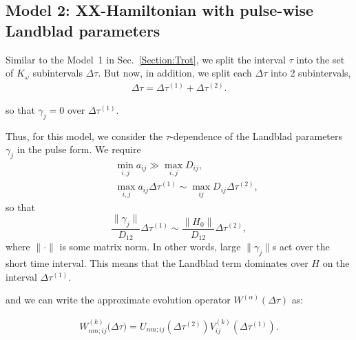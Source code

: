 \documentclass[pra,preprint,showpacs]{revtex4-1}
\begin{document}
{\subsection{Model 2: XX-Hamiltonian with pulse-wise Landblad parameters}
\label{Section:Model2}
Similar to the Model~1 in Sec.~\ref{Section:Trot}, we split the interval $\tau$ into the set of $K_\omega$ subintervals $\Delta \tau$. But now, in addition,  we split
each $\Delta \tau$ into 2 subintervals,
\begin{eqnarray}\label{subint}
\Delta \tau= \Delta \tau^{(1)}+ \Delta \tau^{(2)}.
\end{eqnarray}
\iffalse
so that
\begin{eqnarray}\label{HHj}
H_j=\left\{ \begin{array}{ll}
H_0, & \tau \in \Delta\tau^{(1)}\cr
H_0 + \Omega_j, & \tau \in \Delta\tau^{(2)}
\end{array}
\right.
\end{eqnarray}
\fi
so that $\gamma_j=0$ over $\Delta\tau^{(1)}$.
{Thus, for this model,  we consider the $\tau$-dependence of the Landblad parameters $\gamma_j$  in the pulse form. %
We require
\begin{eqnarray}\label{avar}
&&
\min_{i,j} a_{ij} \gg \max_{i,j} D_{ij}, \\\nonumber
&&\max_{i, j}a_{ij} \Delta \tau^{(1)}\sim \max_{ij}D_{ij} \Delta \tau^{(2)},
\end{eqnarray}
so that
$$
\frac{\|\gamma_j\|}{D_{12}} \Delta\tau^{(1)} \sim \frac{\|H_0\|}{D_{12}} \Delta\tau^{(2)}  ,
$$
where $\|\cdot\|$ is some matrix norm. In other words,  large $\|\gamma_j\|$s act over the short time interval. This means that the Landblad term dominates  over $H$ on the interval
$\Delta\tau^{(1)}$.
\iffalse
Therefore we can approximate Hamiltonian~(\ref{HHj}) as
\begin{eqnarray}\label{HHj2}
H_j\approx \left\{ \begin{array}{ll}
H_0, & \tau \in \Delta\tau^{(2)}\cr
\Omega_j, & \tau \in \Delta\tau^{(1)}
\end{array}
\right.
\end{eqnarray}
\fi
and we can write the approximate evolution operator $W^{(\alpha)}(\Delta \tau)$ as:
\iffalse
\begin{eqnarray}\label{Vj}
U_j(\Delta \tau)=    e^{-i \frac{H_0}{D_{12}} \Delta\tau^{(1)}}  e^{-i \frac{H_0+\Omega_j}{D_{12}} \Delta\tau^{(2)}} \approx
  e^{-i \frac{H_0}{D_{12}} \Delta\tau^{(1)}}e^{-i \frac{\Omega_j}{D_{12}} \Delta\tau^{(2)}}.
\end{eqnarray}
\fi
\begin{eqnarray}\label{Walpha2}
W^{(k)}_{nm;ij}\Big({\Delta \tau}\Big)  =   U_{nm;ij}(\Delta\tau^{(2)})V^{(k)}_{ij}       (\Delta\tau^{(1)}).
\end{eqnarray}

}}
\end{document}
